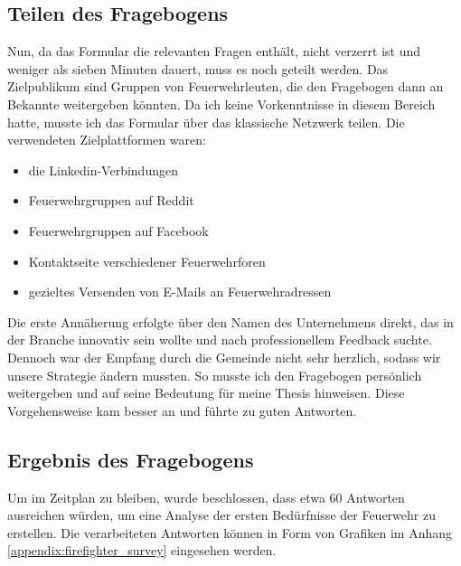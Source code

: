 \subsection{Teilen des Fragebogens}

Nun, da das Formular die relevanten Fragen enthält, nicht verzerrt ist und weniger als sieben Minuten dauert, muss es noch geteilt werden.
Das Zielpublikum sind Gruppen von Feuerwehrleuten, die den Fragebogen dann an Bekannte weitergeben könnten.
Da ich keine Vorkenntnisse in diesem Bereich hatte, musste ich das Formular über das klassische Netzwerk teilen.
Die verwendeten Zielplattformen waren:

\begin{itemize}
  \item die Linkedin-Verbindungen
  \item Feuerwehrgruppen auf Reddit
  \item Feuerwehrgruppen auf Facebook
  \item Kontaktseite verschiedener Feuerwehrforen
  \item gezieltes Versenden von E-Mails an Feuerwehradressen
\end{itemize}

Die erste Annäherung erfolgte über den Namen des Unternehmens direkt, das in der Branche innovativ sein wollte und nach professionellem Feedback suchte.
Dennoch war der Empfang durch die Gemeinde nicht sehr herzlich, sodass wir unsere Strategie ändern mussten.
So musste ich den Fragebogen persönlich weitergeben und auf seine Bedeutung für meine Thesis hinweisen.
Diese Vorgehensweise kam besser an und führte zu guten Antworten.

\subsection{Ergebnis des Fragebogens}

Um im Zeitplan zu bleiben, wurde beschlossen, dass etwa 60 Antworten ausreichen würden, um eine Analyse der ersten Bedürfnisse der Feuerwehr zu erstellen.
Die verarbeiteten Antworten können in Form von Grafiken im Anhang \ref{appendix:firefighter_survey} eingesehen werden.

